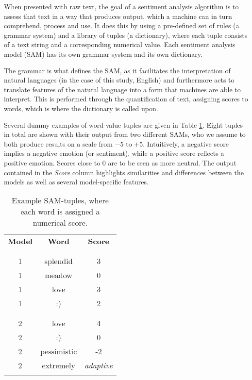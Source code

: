 \documentclass{article}
\begin{document}
When presented with raw text, the goal of a sentiment analysis algorithm is to assess that text in a way that produces output, which a machine can in turn comprehend, process and use. It does this by using a pre-defined set of rules (a grammar system) and a library of tuples (a dictionary), where each tuple consists of a text string and a corresponding numerical value. Each sentiment analysis model (SAM) has its own grammar system and its own dictionary.

The grammar is what defines the SAM, as it facilitates the interpretation of natural languages (in the case of this study, English) and furthermore acts to translate features of the natural language into a form that machines are able to interpret. This is performed through the quantification of text, assigning scores to words, which is where the dictionary is called upon.

Several dummy examples of word-value tuples are given in Table \ref{tab:example-tuples}. Eight tuples in total are shown with their output from two different SAMs, who we assume to both produce results on a scale from $-5$ to $+5$. Intuitively, a negative score implies a negative emotion (or sentiment), while a positive score reflects a positive emotion. Scores close to $0$ are to be seen as more neutral. The output contained in the \emph{Score} column highlights similarities and differences between the models as well as several model-specific features.

\vspace{3mm}

\begin{table}[htb]
\centering
\begin{tabular}{ccc}
\textbf{Model} & \textbf{Word} & \textbf{Score}\\
 &  & \\
\hline
 &  & \\
1 & splendid & 3\\
1 & meadow & 0\\
1 & love & 3\\
1 & :) & 2\\
 &  & \\
\hline
 &  & \\
2 & love & 4\\
2 & :) & 0\\
2 & pessimistic & -2\\
2 & extremely & \emph{adaptive}\\
 &  & \\
\end{tabular}\caption[Representative sentiment analysis scores for individual words]{\label{tab:example-tuples}Example SAM-tuples, where each word is assigned a numerical score.}

\end{table}
\end{document}
